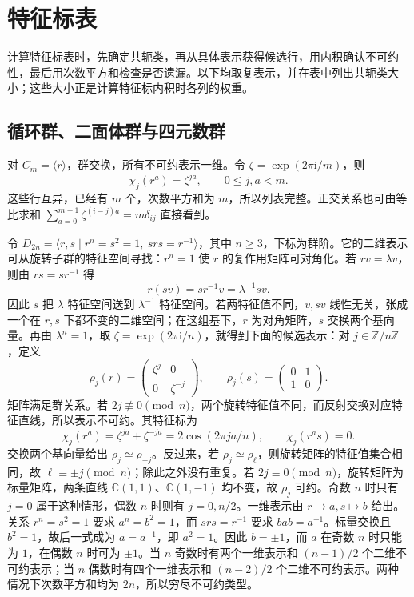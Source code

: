 

\section{特征标表}
\label{b5:sec:0204}

计算特征标表时，先确定共轭类，再从具体表示获得候选行，用内积确认不可约性，最后用次数平方和检查是否遗漏。以下均取复表示，并在表中列出共轭类大小；这些大小正是计算特征标内积时各列的权重。


\subsection{循环群、二面体群与四元数群}
\label{b5:subsec:0204:01}

对 \(C_m=\langle r\rangle\)，群交换，所有不可约表示一维。令 \(\zeta=\exp(2\pi\mathrm i/m)\)，则
\[
	\chi_j(r^a)=\zeta^{ja},\qquad 0\le j,a<m.
\]
这些行互异，已经有 \(m\) 个，次数平方和为 \(m\)，所以列表完整。正交关系也可由等比求和 \(\sum_{a=0}^{m-1}\zeta^{(i-j)a}=m\delta_{ij}\) 直接看到。

\ProseParagraphBreak
令 \(D_{2n}=\langle r,s\mid r^n=s^2=1,\ srs=r^{-1}\rangle\)，其中 \(n\ge3\)，下标为群阶。它的二维表示可从旋转子群的特征空间寻找：\(r^n=1\) 使 \(r\) 的复作用矩阵可对角化。若 \(rv=\lambda v\)，则由 \(rs=sr^{-1}\) 得
\[
	r(sv)=sr^{-1}v=\lambda^{-1}sv.
\]
因此 \(s\) 把 \(\lambda\) 特征空间送到 \(\lambda^{-1}\) 特征空间。若两特征值不同，\(v,sv\) 线性无关，张成一个在 \(r,s\) 下都不变的二维空间；在这组基下，\(r\) 为对角矩阵，\(s\) 交换两个基向量。再由 \(\lambda^n=1\)，取 \(\zeta=\exp(2\pi\mathrm i/n)\)，就得到下面的候选表示：对 \(j\in\mathbb Z/n\mathbb Z\)，定义
\[
	\rho_j(r)=\begin{pmatrix}\zeta^j&0\\0&\zeta^{-j}\end{pmatrix},
	\qquad
	\rho_j(s)=\begin{pmatrix}0&1\\1&0\end{pmatrix}.
\]
矩阵满足群关系。若 \(2j\not\equiv0\pmod n\)，两个旋转特征值不同，而反射交换对应特征直线，所以表示不可约。其特征标为
\[
	\chi_j(r^a)=\zeta^{ja}+\zeta^{-ja} =2\cos(2\pi ja/n),\qquad \chi_j(r^as)=0.
\]
交换两个基向量给出 \(\rho_j\simeq\rho_{-j}\)。反过来，若 \(\rho_j\simeq\rho_\ell\)，则旋转矩阵的特征值集合相同，故 \(\ell\equiv\pm j\pmod n\)；除此之外没有重复。若 \(2j\equiv0\pmod n\)，旋转矩阵为标量矩阵，两条直线 \(\mathbb C(1,1)\)、\(\mathbb C(1,-1)\) 均不变，故 \(\rho_j\) 可约。奇数 \(n\) 时只有 \(j=0\) 属于这种情形，偶数 \(n\) 时则有 \(j=0,n/2\)。一维表示由 \(r\mapsto a,s\mapsto b\) 给出。关系 \(r^n=s^2=1\) 要求 \(a^n=b^2=1\)，而 \(srs=r^{-1}\) 要求 \(bab=a^{-1}\)。标量交换且 \(b^2=1\)，故后一式成为 \(a=a^{-1}\)，即 \(a^2=1\)。因此 \(b=\pm1\)，而 \(a\) 在奇数 \(n\) 时只能为 \(1\)，在偶数 \(n\) 时可为 \(\pm1\)。当 \(n\) 奇数时有两个一维表示和 \((n-1)/2\) 个二维不可约表示；当 \(n\) 偶数时有四个一维表示和 \((n-2)/2\) 个二维不可约表示。两种情况下次数平方和均为 \(2n\)，所以穷尽不可约类型。

